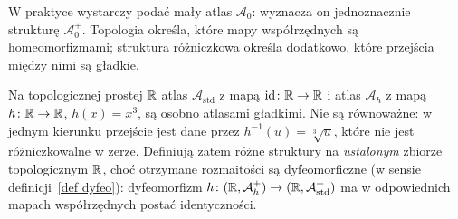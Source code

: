 W praktyce wystarczy podać mały atlas $\mathcal A_0$:
wyznacza on jednoznacznie strukturę $\mathcal A_0^+$.
Topologia określa, które mapy współrzędnych są homeomorfizmami;
struktura różniczkowa określa dodatkowo, które przejścia
między nimi są gładkie.

\begin{przyklad}
Na topologicznej prostej $\mathbb{R}$ atlas $\mathcal A_{\mathrm{std}}$
z mapą $\mathrm{id}\colon\mathbb{R}\to\mathbb{R}$ i atlas $\mathcal A_h$ z mapą
$h\colon\mathbb{R}\to\mathbb{R}$, $h(x)=x^3$, są osobno atlasami gładkimi.
Nie są równoważne: w jednym kierunku
przejście jest dane przez $h^{-1}(u)=\sqrt[3]{u}$,
które nie jest różniczkowalne w zerze.
Definiują zatem różne struktury na \emph{ustalonym} zbiorze
topologicznym $\mathbb{R}$, choć otrzymane rozmaitości są
dyfeomorficzne (w sensie definicji~\ref{def dyfeo}): dyfeomorfizm
$h\colon(\mathbb{R},\mathcal A_h^+)\to(\mathbb{R},\mathcal A_{\mathrm{std}}^+)$
ma w odpowiednich mapach współrzędnych postać identyczności.
\end{przyklad}

